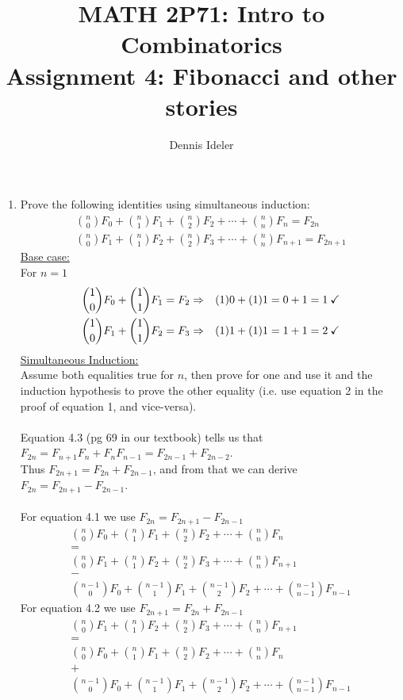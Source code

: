 \documentclass[10pt,a4paper,final]{article}
\author{Dennis Ideler}
\title{MATH 2P71: Intro to Combinatorics\\Assignment 4: Fibonacci and other stories}
\begin{document}
\maketitle

\begin{enumerate}
\item %
Prove the following identities using simultaneous induction:
\begin{eqnarray}
\binom{n}{0}F_0 + \binom{n}{1}F_1 + \binom{n}{2}F_2 + \cdots + \binom{n}{n}F_n = F_{2n}\\
\binom{n}{0}F_1 + \binom{n}{1}F_2 + \binom{n}{2}F_3 + \cdots + \binom{n}{n}F_{n+1} = F_{2n+1}
\end{eqnarray}
\underline{Base case:}\\
For $n=1$
\begin{eqnarray}
\setcounter{equation}{1}
\binom{1}{0}F_0 + \binom{1}{1}F_1 = F_2 &\Rightarrow& (1)0 + (1)1 = 0+1 = 1 \: \checkmark\\
\binom{1}{0}F_1 + \binom{1}{1}F_2 = F_3 &\Rightarrow& (1)1 + (1)1 = 1+1 = 2 \: \checkmark
\end{eqnarray}
\underline{Simultaneous Induction:}\\
Assume both equalities true for $n$, then prove for one and use it and the induction hypothesis to prove
the other equality (i.e. use equation 2 in the proof of equation 1, and vice-versa).\\
\\
Equation 4.3 (pg 69 in our textbook) tells us that $F_{2n} = F_{n+1}F_n + F_nF_{n-1} = F_{2n-1} + F_{2n-2}$.\\
Thus $F_{2n+1} = F_{2n} + F_{2n-1}$, and from that we can derive $F_{2n} = F_{2n+1} - F_{2n-1}$.\\
\\
For equation 4.1 we use $F_{2n} = F_{2n+1} - F_{2n-1}$
\begin{eqnarray*}
&\binom{n}{0}F_0 + \binom{n}{1}F_1 + \binom{n}{2}F_2 + \cdots + \binom{n}{n}F_n \\ &=& \\
&\binom{n}{0}F_1 + \binom{n}{1}F_2 + \binom{n}{2}F_3 + \cdots + \binom{n}{n}F_{n+1} \\ &-& \\
&\binom{n-1}{0}F_0 + \binom{n-1}{1}F_1 + \binom{n-1}{2}F_2 + \cdots + \binom{n-1}{n-1}F_{n-1}
\end{eqnarray*}
For equation 4.2 we use $F_{2n+1} = F_{2n} + F_{2n-1}$
\begin{eqnarray*}
&\binom{n}{0}F_1 + \binom{n}{1}F_2 + \binom{n}{2}F_3 + \cdots + \binom{n}{n}F_{n+1} \\ &=& \\
&\binom{n}{0}F_0 + \binom{n}{1}F_1 + \binom{n}{2}F_2 + \cdots + \binom{n}{n}F_n \\ &+& \\
&\binom{n-1}{0}F_0 + \binom{n-1}{1}F_1 + \binom{n-1}{2}F_2 + \cdots + \binom{n-1}{n-1}F_{n-1}
\end{eqnarray*}


\end{enumerate}
\end{document}
